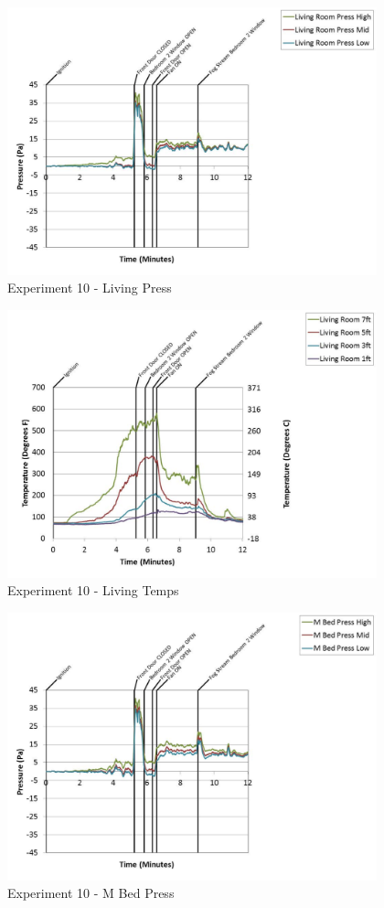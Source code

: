 \documentclass{article}
\begin{document}
\begin{appendices}
	\begin{figure}[h!]
		\centering
		\includegraphics[height=3.05in]{0_Images/Results_Charts/Exp_10_Charts/LivingPress.pdf}
		\caption{Experiment 10 - Living Press}
	\end{figure}
 
	\clearpage

	\begin{figure}[h!]
		\centering
		\includegraphics[height=3.05in]{0_Images/Results_Charts/Exp_10_Charts/LivingTemps.pdf}
		\caption{Experiment 10 - Living Temps}
	\end{figure}
 

	\begin{figure}[h!]
		\centering
		\includegraphics[height=3.05in]{0_Images/Results_Charts/Exp_10_Charts/MBedPress.pdf}
		\caption{Experiment 10 - M Bed Press}
	\end{figure}
 

\end{appendices}
\end{document}
